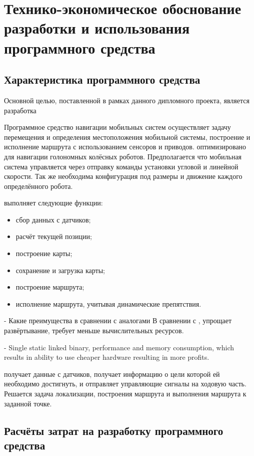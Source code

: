 \section{Технико-экономическое обоснование разработки и использования
программного средства}

\subsection{Характеристика программного средства}
Основной целью, поставленной в рамках данного дипломного проекта, является
разработка

Программное средство навигации мобильных систем осуществляет задачу перемещения
и определения местоположения мобильной системы, построение и исполнение 
маршрута с использованием сенсоров и приводов. \appname{} оптимизировано для
навигации голономных колёсных роботов. Предполагается что мобильная система 
управляется через отправку команды установки угловой и линейной скорости. 
Так же необходима конфигурация под размеры и движение каждого определённого
робота.

\appname{} выполняет следующие функции:

\begin{itemize}
	\item сбор данных с датчиков;
	\item расчёт текущей позиции;
	\item построение карты;
	\item сохранение и загрузка карты;
	\item построение маршрута;
	\item исполнение маршрута, учитывая динамические препятствия.
\end{itemize}

- Какие преимущества в сравнении с аналогами
В сравнении с \ros{}, \appname{} упрощает развёртывание, требует меньше
вычислительных ресурсов.


- Single static linked binary, performance and memory consumption,
which results in ability to use cheaper hardware resulting in more profits.


\appname{} получает данные с датчиков, получает информацию о цели которой ей 
необходимо достигнуть, и отправляет управляющие сигналы на ходовую часть. 
Решается задача локализации, построения маршрута и выполнения маршрута 
к заданной точке. 

\subsection{Расчёты затрат на разработку программного средства}

